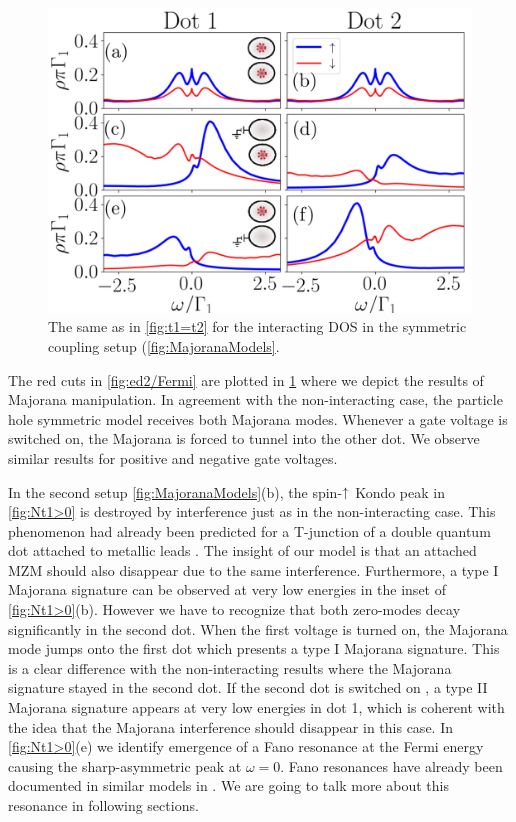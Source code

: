 \begin{figure}[bt]
\begin{center}
\includegraphics[scale=0.5]{IMAGES/NRG/t1=t2.png}
\caption{ \label{fig:Nt1=t2} The same as in \ref{fig:t1=t2} for the  interacting DOS in the symmetric coupling setup (\ref{fig:MajoranaModels}.\protect{}
}
%
\end{center}
\end{figure}

    The red cuts in \ref{fig:ed2/Fermi} are plotted in \ref{fig:Nt1=t2} where we depict the results of Majorana manipulation. In agreement with the non-interacting case, the particle hole symmetric model receives both Majorana modes. Whenever a gate voltage is switched on, the Majorana is forced to tunnel into the other dot. We observe similar results for positive and negative gate voltages. 

 
 In the second setup \ref{fig:MajoranaModels}(b), the spin-$\uparrow$ Kondo peak in  \ref{fig:Nt1>0} is destroyed by interference just as in the non-interacting case. This phenomenon had already been predicted for a T-junction of a double quantum dot attached to metallic leads \cite{dias_da_silva_transmission_2008}. The insight of our model is that an attached MZM should also disappear due to the same interference. Furthermore, a type I Majorana signature can be observed at very low energies in the inset of \ref{fig:Nt1>0}(b). However we have to recognize that both zero-modes decay significantly in the second dot. When the first voltage is turned on, the Majorana mode jumps onto the first dot which presents a type I Majorana signature. This is a clear difference with the non-interacting results where the Majorana signature stayed in the second dot.  If the second dot is switched on , a type II Majorana signature appears at very low energies in dot 1, which is coherent with the idea that the Majorana interference should disappear in this case. In \ref{fig:Nt1>0}(e) we identify emergence of a Fano resonance at the Fermi energy causing the sharp-asymmetric peak at $\omega = 0$. Fano resonances have already been documented in similar models in \cite{schuray_fano_2017}. We are going to talk more about this resonance in following sections. 



